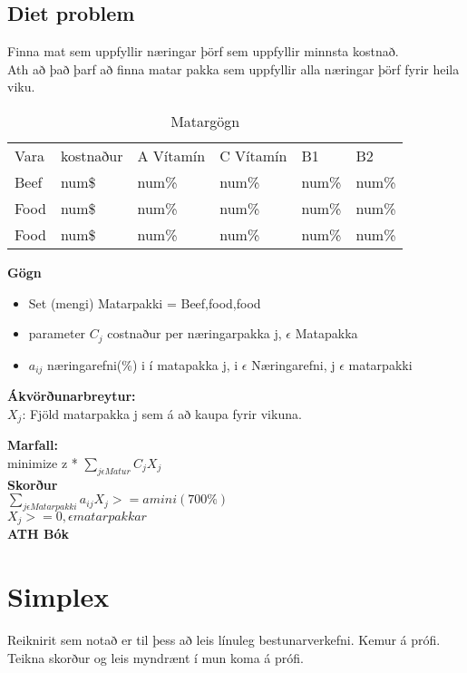 \documentclass[]{article}
\begin{document}
\subsection*{Diet problem}
Finna mat sem uppfyllir næringar þörf sem uppfyllir minnsta kostnað.\\
Ath að það þarf að finna matar pakka sem uppfyllir alla næringar þörf fyrir heila viku.\\

\begin{table}[h]
	\centering
	\caption{Matargögn}
	\label{my-label}
	\begin{tabular}{llllll}
		Vara & kostnaður & A Vítamín & C Vítamín & B1    & B2    \\
		Beef & num\$     & num\%     & num\%     & num\% & num\% \\   
		Food & num\$     & num\%     & num\%     & num\% & num\% \\
		Food & num\$     & num\%     & num\%     & num\% & num\% \\
	\end{tabular}
\end{table}

\textbf{Gögn}

\begin{itemize}
	\item Set (mengi) Matarpakki = {Beef,food,food}
	\item parameter $C_{j}$ costnaður per næringarpakka j, $\epsilon$ Matapakka 
	\item $a_{ij}$ næringarefni(\%) i í matapakka j, i $\epsilon$ Næringarefni, j $\epsilon$ matarpakki
\end{itemize}

\textbf{Ákvörðunarbreytur:}\\
$X_{j}$: Fjöld matarpakka j sem á að kaupa fyrir vikuna.

\textbf{Marfall:} \\
minimize z * $\sum\limits_{j \epsilon Matur}^{} C_{j}X_{j}$\\

\textbf{Skorður} \\
$\sum\limits_{j \epsilon Matarpakki}^{} a_{ij}X_{j} >= amini (700\%)$\\
$X_{j} >= 0, \epsilon matarpakkar$\\

\textbf{ATH Bók}\\

\section*{Simplex}
Reiknirit sem notað er til þess að leis línuleg bestunarverkefni. Kemur á prófi.\\
Teikna skorður og leis myndrænt í mun koma á prófi. \\
\end{document}
